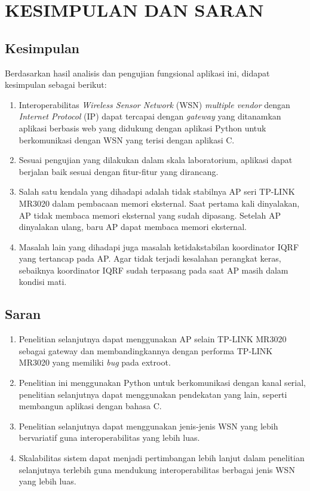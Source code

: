
\chapter{KESIMPULAN DAN SARAN}

\section{Kesimpulan}
	Berdasarkan hasil analisis dan pengujian fungsional aplikasi ini, didapat kesimpulan sebagai berikut:

	\begin{enumerate}
		\item Interoperabilitas \emph{Wireless Sensor Network} (WSN) \emph{multiple vendor} dengan \emph{Internet Protocol} (IP) dapat tercapai dengan \emph{gateway} yang ditanamkan aplikasi berbasis web yang didukung dengan aplikasi Python untuk berkomunikasi dengan WSN yang terisi dengan aplikasi C.

		\item Sesuai pengujian yang dilakukan dalam skala laboratorium, aplikasi dapat berjalan baik sesuai dengan fitur-fitur yang dirancang.

		\item Salah satu kendala yang dihadapi adalah tidak stabilnya AP seri TP-LINK MR3020 dalam pembacaan memori eksternal. Saat pertama kali dinyalakan, AP tidak membaca memori eksternal yang sudah dipasang. Setelah AP dinyalakan ulang, baru AP dapat membaca memori eksternal.

		\item Masalah lain yang dihadapi juga masalah ketidakstabilan koordinator IQRF yang tertancap pada AP. Agar tidak terjadi kesalahan perangkat keras, sebaiknya koordinator IQRF sudah terpasang pada saat AP masih dalam kondisi mati.
	\end{enumerate}


\section{Saran}
	\begin{enumerate}
		\item Penelitian selanjutnya dapat menggunakan AP selain TP-LINK MR3020 sebagai gateway dan membandingkannya dengan performa TP-LINK MR3020 yang memiliki \emph{bug} pada extroot.
		\item Penelitian ini menggunakan Python untuk berkomunikasi dengan kanal serial, penelitian selanjutnya dapat menggunakan pendekatan yang lain, seperti membangun aplikasi dengan bahasa C.
		\item Penelitian selanjutnya dapat menggunakan jenis-jenis WSN yang lebih bervariatif guna interoperabilitas yang lebih luas.
		\item Skalabilitas sistem dapat menjadi pertimbangan lebih lanjut dalam penelitian selanjutnya terlebih guna mendukung interoperabilitas berbagai jenis WSN yang lebih luas.
	\end{enumerate}

	
\begin{comment}

\end{comment}
